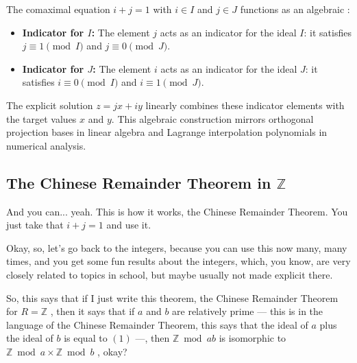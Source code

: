 \begin{insight}
The comaximal equation $i + j = 1$ with $i \in I$ and $j \in J$ functions as an algebraic :
\begin{itemize}
    \item \textbf{Indicator for $I$:} The element $j$ acts as an indicator for the ideal $I$: it satisfies $j \equiv 1 \pmod I$ and $j \equiv 0 \pmod J$.
    \item \textbf{Indicator for $J$:} The element $i$ acts as an indicator for the ideal $J$: it satisfies $i \equiv 0 \pmod I$ and $i \equiv 1 \pmod J$.
\end{itemize}
The explicit solution $z = jx + iy$ linearly combines these indicator elements with the target values $x$ and $y$. This algebraic construction mirrors orthogonal projection bases in linear algebra and Lagrange interpolation polynomials in numerical analysis.
\end{insight}

\begin{hidden}
\end{hidden}

\subsection{The Chinese Remainder Theorem in \texorpdfstring{$\mathbb{Z}$}{Z}}

\begin{speech}[00:13:45 - 00:15:00]
And you can... yeah. This is how it works, the Chinese Remainder Theorem. You just take that $i + j = 1$ and use it. 

Okay, so, let's go back to the integers, because you can use this now many, many times, and you get some fun results about the integers, which, you know, are very closely related to topics in school, but maybe usually not made explicit there.

So, this says that if I just write this theorem, the Chinese Remainder Theorem for $R = \mathbb{Z}$ , then it says that if $a$ and $b$ are relatively prime  --- this is in the language of the Chinese Remainder Theorem, this says that the ideal of $a$ plus the ideal of $b$ is equal to $(1)$  ---, then $\mathbb{Z} \bmod ab$ is isomorphic to $\mathbb{Z} \bmod a \times \mathbb{Z} \bmod b$ , okay?
\end{speech}

